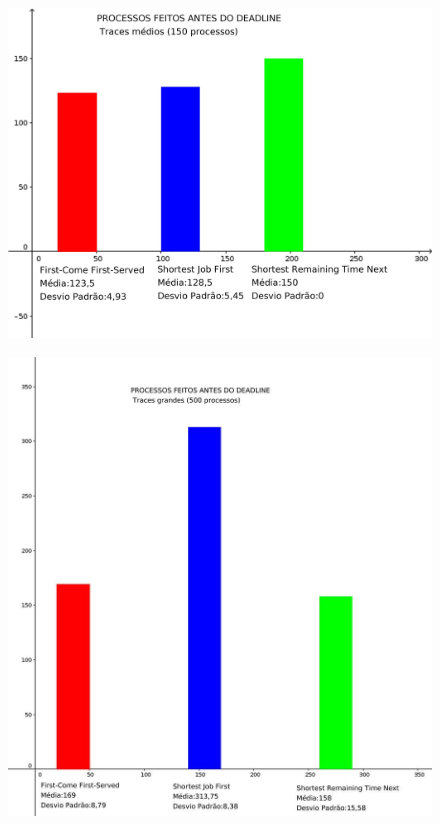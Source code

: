 \documentclass{beamer}
\begin{document}
\begin{frame}
\begin{figure}[h]
  \centering\includegraphics[scale=0.15]{table2.jpg}
\end{figure}
\end{frame}

\begin{frame}
\begin{figure}[h]
  \centering\includegraphics[scale=0.25]{table3.jpg}
\end{figure}
\end{frame}
\end{document}
